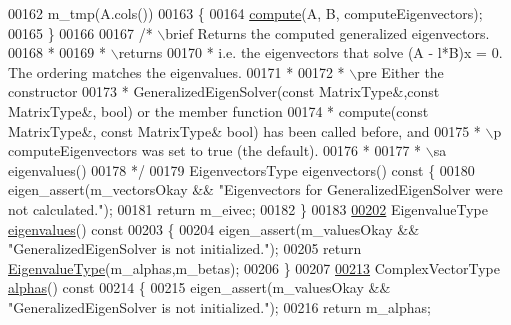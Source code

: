 \begin{DoxyCode}
00162         m\_tmp(A.cols())
00163     \{
00164       \hyperlink{group___eigenvalues___module_a275910b47dfe5f40211dcb59cfd68f3c}{compute}(A, B, computeEigenvectors);
00165     \}
00166 
00167     \textcolor{comment}{/* \(\backslash\)brief Returns the computed generalized eigenvectors.}
00168 \textcolor{comment}{      *}
00169 \textcolor{comment}{      * \(\backslash\)returns  %
00170 \textcolor{comment}{      * i.e. the eigenvectors that solve (A - l*B)x = 0. The ordering matches the eigenvalues.}
00171 \textcolor{comment}{      *}
00172 \textcolor{comment}{      * \(\backslash\)pre Either the constructor }
00173 \textcolor{comment}{      * GeneralizedEigenSolver(const MatrixType&,const MatrixType&, bool) or the member function}
00174 \textcolor{comment}{      * compute(const MatrixType&, const MatrixType& bool) has been called before, and}
00175 \textcolor{comment}{      * \(\backslash\)p computeEigenvectors was set to true (the default).}
00176 \textcolor{comment}{      *}
00177 \textcolor{comment}{      * \(\backslash\)sa eigenvalues()}
00178 \textcolor{comment}{      */}
00179     EigenvectorsType eigenvectors()\textcolor{keyword}{ const }\{
00180       eigen\_assert(m\_vectorsOkay && \textcolor{stringliteral}{"Eigenvectors for GeneralizedEigenSolver were not calculated."});
00181       \textcolor{keywordflow}{return} m\_eivec;
00182     \}
00183 
\hyperlink{group___eigenvalues___module_a62f01cd78271efd5e39bcb24e0fe1a58}{00202}     EigenvalueType \hyperlink{group___eigenvalues___module_a62f01cd78271efd5e39bcb24e0fe1a58}{eigenvalues}()\textcolor{keyword}{ const}
00203 \textcolor{keyword}{    }\{
00204       eigen\_assert(m\_valuesOkay && \textcolor{stringliteral}{"GeneralizedEigenSolver is not initialized."});
00205       \textcolor{keywordflow}{return} \hyperlink{group___eigenvalues___module_ad59af178acc401f1bc4e330ef80f286d}{EigenvalueType}(m\_alphas,m\_betas);
00206     \}
00207 
\hyperlink{group___eigenvalues___module_a82b1bc41267f46e5c5899d5b084a73bb}{00213}     ComplexVectorType \hyperlink{group___eigenvalues___module_a82b1bc41267f46e5c5899d5b084a73bb}{alphas}()\textcolor{keyword}{ const}
00214 \textcolor{keyword}{    }\{
00215       eigen\_assert(m\_valuesOkay && \textcolor{stringliteral}{"GeneralizedEigenSolver is not initialized."});
00216       \textcolor{keywordflow}{return} m\_alphas;
}
\end{DoxyCode}
